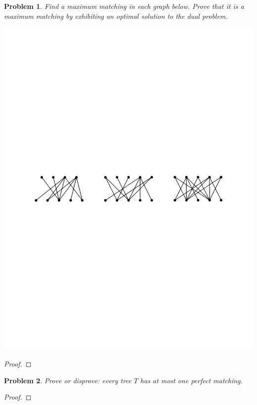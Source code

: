 \documentclass[11pt]{article}
\newtheorem{problem}{Problem}
\begin{document}
\begin{problem}
Find a maximum matching in each graph below. Prove that it is a maximum matching by exhibiting an optimal solution to the dual problem. 
\begin{center}
\includegraphics[scale=.8]{matchings.pdf}
\end{center}
\end{problem}

\begin{proof}

\end{proof}



\begin{problem}
Prove or disprove: every tree $T$ has at most one perfect matching. 
\end{problem}

\begin{proof}

\end{proof}
\end{document}
